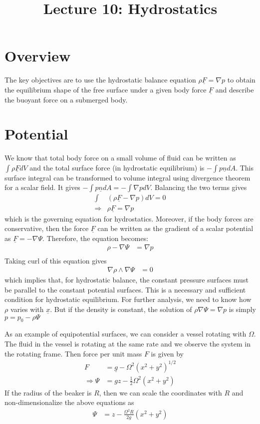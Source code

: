\documentclass[11pt,a4paper]{article}
\title{Lecture 10: Hydrostatics}
\author{}
\newcommand{\vect}[1]{\underline{#1}}
\newcommand{\1}{\vect{1}}
\newcommand{\grad}{\nabla}
\begin{document}
\maketitle

\section*{Overview}
The key objectives are to use the hydrostatic balance equation $\rho \vect F = \grad p$ to obtain the equilibrium shape of the free surface under a given body force $\vect F$ and describe the buoyant force on a submerged body. 


\section{Potential}
We know that total body force on a small volume of fluid can be written as $\int\rho \vect F dV$ and the total surface force (in hydrostatic equilibrium) is $-\int p \vect n dA$. This surface integral can be transformed to volume integral using divergence theorem for a scalar field. It gives $-\int p \vect n dA = -\int \grad p dV$. Balancing the two terms gives
\begin{align*}
\int&(\rho \vect F - \grad p) dV =0\\
\Rightarrow& \rho \vect F = \grad p
\end{align*}
which is the governing equation for hydrostatics. Moreover, if the body forces are conservative, then the force $\vect F$ can be written as the gradient of a scalar potential as $\vect F= -\grad \Psi$. Therefore, the equation becomes:
\begin{align*}
\rho -\grad \Psi &= \grad p \\
\end{align*}
Taking curl of this equation gives
\begin{align*}
\grad \rho \wedge \grad \Psi &= 0
\end{align*}
which implies that, for hydrostatic balance, the constant pressure surfaces must be parallel to the constant potential surfaces. This is a necessary and sufficient condition for hydrostatic equilibrium. For further analysis, we need to know how $\rho$ varies with $\vect x$. But if the density is constant, the solution of $\rho \grad \Psi = \grad p$ is simply $p=p_0 - \rho \Psi$

As an example of equipotential surfaces, we can consider a vessel rotating with $\Omega$. The fluid in the vessel is rotating at the same rate and we observe the system in the rotating frame. Then force per unit mass $F$ is given by
\begin{align*}
F &= \vect g - \Omega^2 (x^2+y^2)^{1/2}\\
\Rightarrow \Psi &= gz - \frac{1}{2}\Omega^2(x^2+y^2)
\end{align*}
If the radius of the beaker is $R$, then we can scale the coordinates with $R$ and non-dimensionalize the above equations as
\begin{align*}
\Psi &= z - \frac{\Omega^2 R}{2g}(x^2+y^2)
\end{align*}
\end{document}
